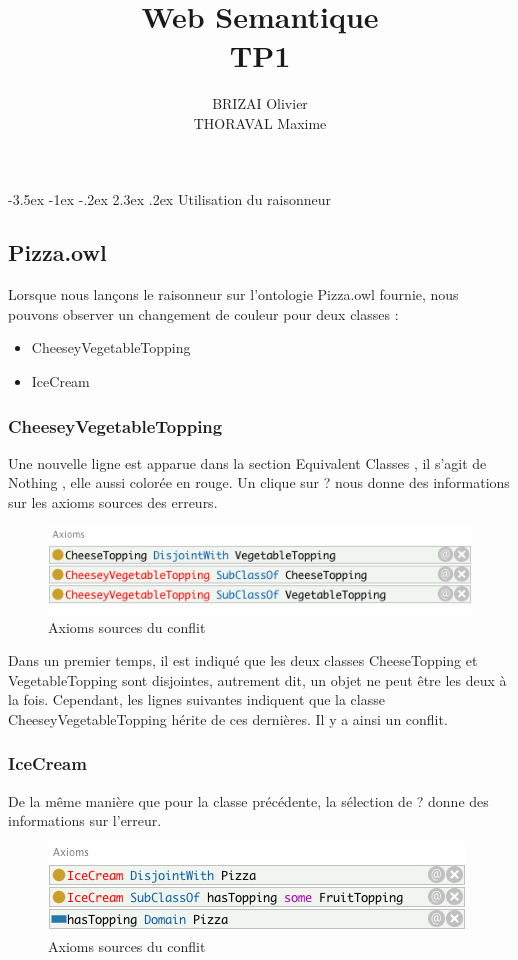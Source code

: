 \documentclass[a4paper,12pt]{article}
\makeatletter
\renewcommand\section{\@startsection {section}{1}{\z@}%
                           {-3.5ex \@plus -1ex \@minus -.2ex}%
                           {2.3ex \@plus.2ex}%
                           {\normalfont\Large\bfseries}}
\makeatother
\begin{document}
\newpage
\title{Web Semantique\\TP1}
\date{}
\author{BRIZAI Olivier\\THORAVAL Maxime}
\maketitle

\newpage
\section{Utilisation du raisonneur}
\subsection{Pizza.owl}
Lorsque nous lançons le raisonneur sur l'ontologie \og Pizza.owl \fg{} fournie, nous pouvons observer un changement de couleur pour deux classes : 
\begin{itemize}
	\item CheeseyVegetableTopping
	\item IceCream
\end{itemize}

\subsubsection{CheeseyVegetableTopping}
Une nouvelle ligne est apparue dans la section \og Equivalent Classes \fg{}, il s'agit de \og Nothing \fg{}, elle aussi colorée en rouge.
Un clique sur \og ? \fg{} nous donne des informations sur les axioms sources des erreurs.


\begin{figure}[H]
	\center
	\includegraphics{img/axioms.png}
	\caption{Axioms sources du conflit}
\end{figure}

Dans un premier temps, il est indiqué que les deux classes \og CheeseTopping\fg{} et \og VegetableTopping \fg{} sont disjointes, autrement dit, un objet ne peut être les deux à la fois. Cependant, les lignes suivantes indiquent que la classe \og CheeseyVegetableTopping \fg{} hérite de ces dernières. Il y a ainsi un conflit.


\subsubsection{IceCream}
De la même manière que pour la classe précédente, la sélection de \og ? \fg{} donne des informations sur l'erreur.
\begin{figure}[H]
	\center
	\includegraphics{img/icecream.png}
	\caption{Axioms sources du conflit}
\end{figure}
\end{document}
